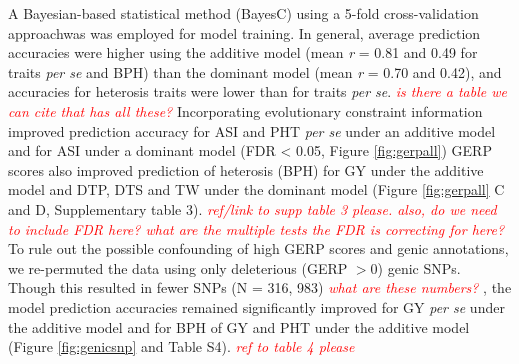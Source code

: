 \documentclass[9pt,twocolumn,twoside]{gsajnl}
\newcommand{\jri}[1]{\textcolor{red}{ \emph{ #1}} }
\begin{document}
A Bayesian-based statistical method (BayesC) \citep{habier2011extension} using a 5-fold cross-validation approachwas was employed for model training. 
In general, average prediction accuracies were higher using the additive model (mean \emph{r} = 0.81 and 0.49 for traits \emph{per se} and BPH) than the dominant model (mean \emph{r} = 0.70 and 0.42), and accuracies for heterosis traits were lower than for traits \emph{per se}. \jri{is there a table we can cite that has all these?}
Incorporating evolutionary constraint information improved prediction accuracy for ASI and PHT \emph{per se} under an additive model and for ASI under a dominant model (FDR < 0.05, Figure \ref{fig:gerpall})
GERP scores also improved prediction of heterosis (BPH) for GY under the additive model and DTP, DTS and TW under the dominant model (Figure \ref{fig:gerpall} C and D, Supplementary table 3). \jri{ref/link to supp table 3 please. also, do we need to include FDR here? what are the multiple tests the FDR is correcting for here?}
To rule out the possible confounding of high GERP scores and genic annotations, we re-permuted the data using only deleterious (GERP $>0$) genic SNPs.  
Though this resulted in fewer SNPs (N = 316, 983) \jri{what are these numbers?}, the model prediction accuracies remained significantly improved for GY \emph{per se} under the additive model and for BPH of GY and PHT under the additive model (Figure \ref{fig:genicsnp} and Table S4). \jri{ref to table 4 please}  

\end{document}
